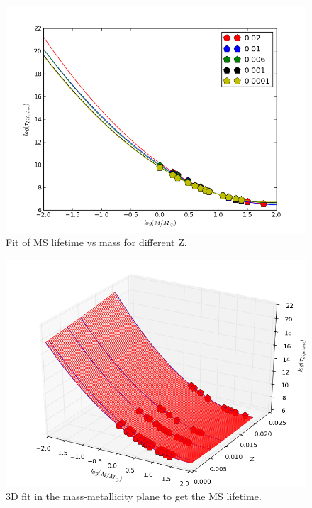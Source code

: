 \begin{figure}
\includegraphics[width=154mm]{figures/lifetime_fit.png}
\caption{Fit of MS lifetime vs mass for different Z.}
\label{lifetimefit}
\end{figure}

\begin{figure}
\includegraphics[width=154mm]{figures/lifetime_fit3D.png}
\caption{3D fit in the mass-metallicity plane to get the MS lifetime.}
\label{lifetimefit3D}
\end{figure}



